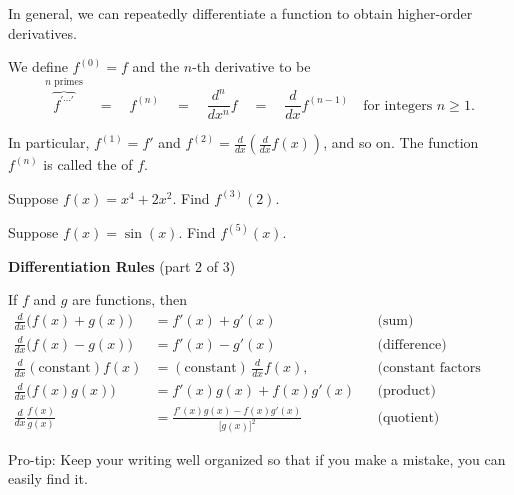 \documentclass[../main.tex]{subfiles}
\begin{document}
In general, we can repeatedly differentiate a function to obtain higher-order derivatives.

\begin{definition} \label{def:higher-derivatives}
  We define \(f^{(0)} = f\) and the \(n\)-th derivative to be
  \[
    \overbrace{f^{' \cdots '}}^{\text{\(n\) primes}} \quad=\quad f^{(n)} \quad=\quad \frac{d^{n}}{dx^{n}} f \quad=\quad \frac{d}{dx} f^{(n-1)} \quad\text{for integers } n \ge 1.
  \]

  In particular, \(f^{(1)} = f'\) and \(f^{(2)} = \frac{d}{dx} \left( \frac{d}{dx} f(x) \right)\), and so on. The function \(f^{(n)}\) is called the  of \(f\).

\end{definition}

\begin{example}
  Suppose \(f(x) = x^{4} + 2x^{2}\). Find \(f^{(3)}(2)\).

  \blanks*
\end{example}

\begin{exercise}
  Suppose \(f(x) = \sin(x)\). Find \(f^{(5)}(x)\).

  \blanks*
\end{exercise}
\clearpage

\begin{mdframed}[style=simple] \label{thm:diff-rules-2}
  \textbf{Differentiation Rules} \hfill {\footnotesize (part \(2\) of \(3\))}

  If \(f\) and \(g\) are  functions, then
  \begin{align*}
    \frac{d}{dx} \bigg(f(x) + g(x)\bigg) &= f'(x) + g'(x) && \text{(sum)} \\[1ex]
    \frac{d}{dx} \bigg(f(x) - g(x)\bigg) &= f'(x) - g'(x) && \text{(difference)} \\[1ex]
    \frac{d}{dx} (\text{constant}) f(x) &= (\text{constant}) \, \frac{d}{dx} f(x),  && \text{(constant factors out)} \\
    \frac{d}{dx} \bigg(f(x)g(x)\bigg) &= { f'(x) g(x) + f(x) g'(x) } && \text{(product)} \\[1ex]
    \frac{d}{dx} \frac{f(x)}{g(x)} &= {\frac{f'(x)g(x) - f(x)g'(x)}{ \big[g(x)\big]^{2} }} && \text{(quotient)}
  \end{align*}
\end{mdframed}
Pro-tip: Keep your writing well organized so that if you make a mistake, you can easily find it.
\end{document}
